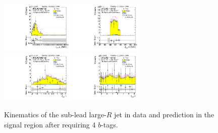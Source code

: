 \begin{figure}[htbp!]
\begin{center}
\includegraphics[width=0.31\textwidth,angle=-90]{figures/boosted/Signal/b77_FourTag_Signal_sublHCand_Pt_m.pdf}
\includegraphics[width=0.31\textwidth,angle=-90]{figures/boosted/Signal/b77_FourTag_Signal_sublHCand_Mass_s.pdf}\\
\includegraphics[width=0.31\textwidth,angle=-90]{figures/boosted/Signal/b77_FourTag_Signal_sublHCand_Eta.pdf}
\includegraphics[width=0.31\textwidth,angle=-90]{figures/boosted/Signal/b77_FourTag_Signal_sublHCand_Phi.pdf}
  \caption{Kinematics of the sub-lead large-$R$ jet in data and prediction in the signal region after requiring 4 $b$-tags. }
  \label{fig:boosted-4b-signal-ak10-subl}
\end{center}
\end{figure}

